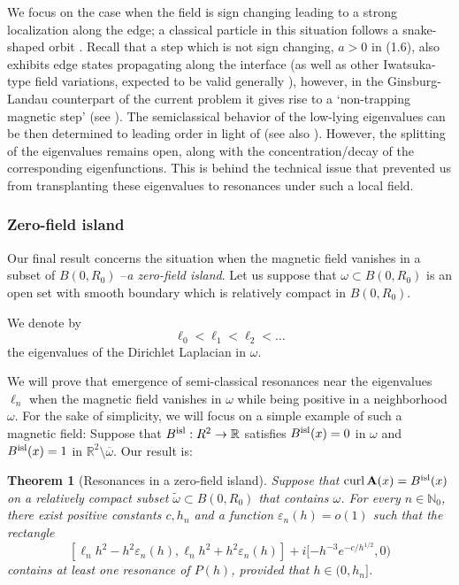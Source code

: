 \documentclass[11pt]{amsart}
\newtheorem{theorem}{Theorem}[section]
\theoremstyle{remark}
\newcommand{\bA}{\mathbf{A}}
\newcommand{\R}{\mathbb{R}}
\DeclareMathOperator{\Curl}{curl}
\numberwithin{equation}{section}
\begin{document}
We focus on the case when the field is sign changing leading to a strong localization along the edge; a classical particle in this situation follows a snake-shaped orbit \cite{RPM}. Recall that a step which is not sign changing, $a > 0$ in (1.6), also exhibits edge states propagating along the interface (as well as other Iwatsuka-type field variations, expected to be valid generally \cite[Section~6.5]{CFKS87}), however, in the Ginsburg-Landau counterpart of the current problem it gives rise to a ‘non-trapping magnetic step’ (see \cite[Remark 1.5]{AKS}). The semiclassical behavior of the low-lying eigenvalues can be then determined to leading order in light of \cite[Section~3.2]{AKS} (see also \cite[Proposition 4.2]{A}). However, the splitting of the eigenvalues remains open, along with the concentration/decay of the corresponding eigenfunctions. This is behind the technical issue that prevented us from transplanting these eigenvalues to resonances under such a local field.


%



\subsubsection*{Zero-field island} 
%
Our final result concerns the situation when the magnetic field vanishes in a subset of $B(0,R_0)$ --\emph{a zero-field island}. Let us suppose that $\omega\subset B(0,R_0)$ is an open set with smooth boundary which is relatively compact in $B(0,R_0)$.  

We denote by 
\[\ell_0<\ell_1<\ell_2<\dots\]
the eigenvalues of the Dirichlet Laplacian in $\omega$.

We will prove that emergence of semi-classical resonances  near the eigenvalues $\ell_n$ when the magnetic field vanishes in $\omega$ while being positive in a neighborhood $\omega$. For the sake of simplicity, we will focus on a simple example of such a magnetic field: Suppose that $B^{\rm isl}:\mathbb \R^2\to\mathbb R$ satisfies $B^{\rm isl}(x)=0$ in $\omega$ and $B^{\rm isl}(x)=1$ in $\R^2\setminus\overline{\omega}$. Our result is:

\begin{theorem}[Resonances in a zero-field island]\label{thm:zero island}
    Suppose that $\Curl \bA(x)=B^{\rm isl}(x)$ on a relatively compact subset $\tilde\omega\subset B(0,R_0)$ that contains $\omega$. For every $n\in\mathbb N_0$, there exist positive constants $c,h_n$ and a function $\varepsilon_n(h)=o(1)$ such that the rectangle
\[
 [\ell_nh^2 - h^2\varepsilon_n(h) , \ell_nh^2 + h^2\varepsilon_n(h)] + i[-h^{-3}e^{-c/h^{1/2}}, 0)
\]
contains at least one resonance of $P(h)$, provided that $h\in(0,h_n]$.
\end{theorem}
\end{document}
